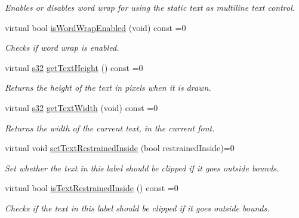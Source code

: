 \begin{DoxyCompactItemize}
\begin{DoxyCompactList}\small\item\em Enables or disables word wrap for using the static text as multiline text control. \end{DoxyCompactList}\item 
virtual bool \hyperlink{classirr_1_1gui_1_1IGUIStaticText_a42d7fbdb196414a1d95146b53e6a3528}{is\+Word\+Wrap\+Enabled} (void) const =0
\begin{DoxyCompactList}\small\item\em Checks if word wrap is enabled. \end{DoxyCompactList}\item 
virtual \hyperlink{namespaceirr_ac66849b7a6ed16e30ebede579f9b47c6}{s32} \hyperlink{classirr_1_1gui_1_1IGUIStaticText_a88e90c238601f17e1f0b0d79c7dc1004}{get\+Text\+Height} () const =0
\begin{DoxyCompactList}\small\item\em Returns the height of the text in pixels when it is drawn. \end{DoxyCompactList}\item 
virtual \hyperlink{namespaceirr_ac66849b7a6ed16e30ebede579f9b47c6}{s32} \hyperlink{classirr_1_1gui_1_1IGUIStaticText_adcfbe869b6c0ab409bbde51d4cba7e5d}{get\+Text\+Width} (void) const =0
\begin{DoxyCompactList}\small\item\em Returns the width of the current text, in the current font. \end{DoxyCompactList}\item 
\mbox{\label{classirr_1_1gui_1_1IGUIStaticText_aaec565b5b45581470d4e524c2efac1b6}} 
virtual void \hyperlink{classirr_1_1gui_1_1IGUIStaticText_aaec565b5b45581470d4e524c2efac1b6}{set\+Text\+Restrained\+Inside} (bool restrained\+Inside)=0
\begin{DoxyCompactList}\small\item\em Set whether the text in this label should be clipped if it goes outside bounds. \end{DoxyCompactList}\item 
\mbox{\label{classirr_1_1gui_1_1IGUIStaticText_a90823f5df79cfd4e2e3a20f38bc3b65a}} 
virtual bool \hyperlink{classirr_1_1gui_1_1IGUIStaticText_a90823f5df79cfd4e2e3a20f38bc3b65a}{is\+Text\+Restrained\+Inside} () const =0
\begin{DoxyCompactList}\small\item\em Checks if the text in this label should be clipped if it goes outside bounds. \end{DoxyCompactList}\item 

\end{DoxyCompactItemize}
